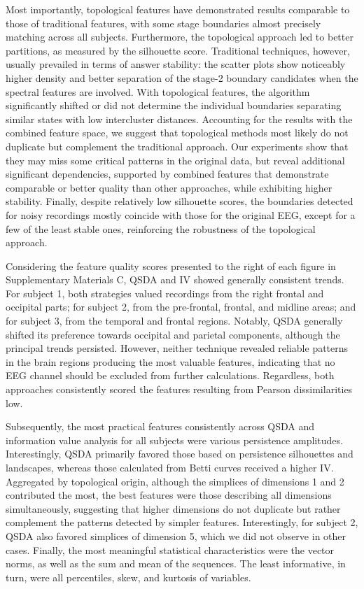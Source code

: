 \documentclass[journal,twoside,web]{ieeecolor2}
\begin{document}
Most importantly, topological features have demonstrated results comparable to those of traditional features, with some stage boundaries almost precisely matching across all subjects. Furthermore, the topological approach led to better partitions, as measured by the silhouette score. Traditional techniques, however, usually prevailed in terms of answer stability: the scatter plots show noticeably higher density and better separation of the stage\mbox{-}2 boundary candidates when the spectral features are involved. With topological features, the algorithm significantly shifted or did not determine the individual boundaries separating similar states with low intercluster distances. Accounting for the results with the combined feature space, we suggest that topological methods most likely do not duplicate but complement the traditional approach. Our experiments show that they may miss some critical patterns in the original data, but reveal additional significant dependencies, supported by combined features that demonstrate comparable or better quality than other approaches, while exhibiting higher stability. Finally, despite relatively low silhouette scores, the boundaries detected for noisy recordings mostly coincide with those for the original EEG, except for a few of the least stable ones, reinforcing the robustness of the topological approach.

Considering the feature quality scores presented to the right of each figure in Supplementary Materials C, QSDA and IV showed generally consistent trends. For subject 1, both strategies valued recordings from the right frontal and occipital parts; for subject 2, from the pre-frontal, frontal, and midline areas; and for subject 3, from the temporal and frontal regions. Notably, QSDA generally shifted its preference towards occipital and parietal components, although the principal trends persisted. However, neither technique revealed reliable patterns in the brain regions producing the most valuable features, indicating that no EEG channel should be excluded from further calculations. Regardless, both approaches consistently scored the features resulting from Pearson dissimilarities low.
 
Subsequently, the most practical features consistently across QSDA and information value analysis for all subjects were various persistence amplitudes. Interestingly, QSDA primarily favored those based on persistence silhouettes and landscapes, whereas those calculated from Betti curves received a higher IV. Aggregated by topological origin, although the simplices of dimensions 1 and 2 contributed the most, the best features were those describing all dimensions simultaneously, suggesting that higher dimensions do not duplicate but rather complement the patterns detected by simpler features. Interestingly, for subject 2, QSDA also favored simplices of dimension 5, which we did not observe in other cases. Finally, the most meaningful statistical characteristics were the vector norms, as well as the sum and mean of the sequences. The least informative, in turn, were all percentiles, skew, and kurtosis of variables.
\end{document}
